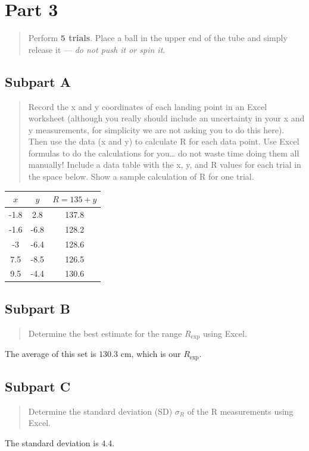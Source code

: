 \documentclass[8pt]{extarticle}
\newcommand{\plain}[1]{\textrm{#1}}
\begin{document}
{\section*{Part 3}
\begin{quote}
	Perform \textbf{5 trials}.  Place a ball in the upper end of the tube and simply release it — \textit{do not push it or spin it}.
\end{quote}
\subsection*{Subpart A}
\begin{quote}
	Record the x and y coordinates of each landing point in an Excel worksheet (although you really should include an uncertainty in your x and y measurements, for simplicity we are not asking you to do this here).  Then use the data (x and y) to calculate R for each data point. Use Excel formulas to do the calculations for you… do not waste time doing them all manually!  Include a data table with the x, y, and R values for each trial in the space below.  Show a sample calculation of R for one trial.
\end{quote}
\begin{center}
	\begin{tabular}{c|c|c}
		$x$ & $y$ & $R = 135 + y$ \\
		\hline
		-1.8 &	2.8 &	137.8 \\
		-1.6 &	-6.8 &	128.2 \\
		-3 &	-6.4 &	128.6 \\
		7.5 & 	-8.5 &	126.5 \\
		9.5 &	-4.4 &	130.6
	\end{tabular}
\end{center}
\subsection*{Subpart B}
\begin{quote}
	Determine the best estimate for the range $ R_{\plain{exp}} $ using Excel.
\end{quote}
The average of this set is $130.3$ cm, which is our $R_{\plain{exp}}$.
\subsection*{Subpart C}
\begin{quote}
	Determine the standard deviation (SD) $ \sigma_R $ of the R measurements using Excel.
\end{quote}
The standard deviation is $4.4$.
}
\end{document}
